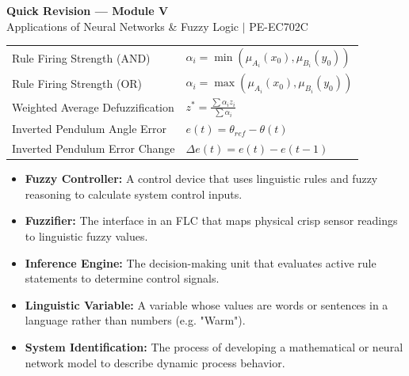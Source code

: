 \documentclass[12pt,a4paper]{article}
\renewcommand{\arraystretch}{1.45}
\begin{document}
\newpage

\begin{center}
  {\large\bfseries\color{myred} Quick Revision --- Module V}\\[3pt]
  {\small\color{mydark} Applications of Neural Networks \& Fuzzy Logic $|$ PE-EC702C}
\end{center}
\noindent{\color{myred}\rule{\linewidth}{1.2pt}}
\vspace{4pt}

\begin{tcolorbox}[formulabox, title={\textbf{Key Formulas at a Glance}}]
\renewcommand{\arraystretch}{1.3}
\begin{tabularx}{\linewidth}{B{5.0cm} X}Rule Firing Strength (AND) & $\alpha_i = \min\left( \mu_{A_i}(x_0), \mu_{B_i}(y_0) \right)$ \\
Rule Firing Strength (OR) & $\alpha_i = \max\left( \mu_{A_i}(x_0), \mu_{B_i}(y_0) \right)$ \\
Weighted Average Defuzzification & $z^* = \frac{\sum \alpha_i z_i}{\sum \alpha_i}$ \\
Inverted Pendulum Angle Error & $e(t) = \theta_{ref} - \theta(t)$ \\
Inverted Pendulum Error Change & $\Delta e(t) = e(t) - e(t-1)$
\end{tabularx}
\end{tcolorbox}

\begin{tcolorbox}[defbox, title={\textbf{One-Line Definitions}}]
\begin{itemize}[leftmargin=*, itemsep=2.5pt, topsep=0pt]
  \item \textbf{Fuzzy Controller:} A control device that uses linguistic rules and fuzzy reasoning to calculate system control inputs.
  \item \textbf{Fuzzifier:} The interface in an FLC that maps physical crisp sensor readings to linguistic fuzzy values.
  \item \textbf{Inference Engine:} The decision-making unit that evaluates active rule statements to determine control signals.
  \item \textbf{Linguistic Variable:} A variable whose values are words or sentences in a language rather than numbers (e.g. "Warm").
  \item \textbf{System Identification:} The process of developing a mathematical or neural network model to describe dynamic process behavior.
\end{itemize}
\end{tcolorbox}
\end{document}
